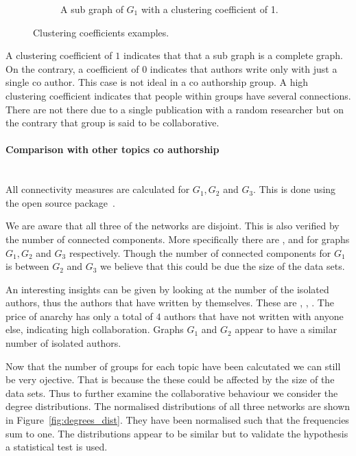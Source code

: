 \documentclass{article}
\theoremstyle{definition}
\newcommand{\prisonerscon}{}
\newcommand{\pricecon}{}
\newcommand{\auctioncon}{}
\newcommand{\prisonerisolated}{}
\newcommand{\auctionisolated}{}
\newcommand{\priceisolated}{}
\begin{document}
\begin{center}
\begin{figure}[!hbtp]
\begin{subfigure}{0.33\textwidth}
            \caption{A sub graph of \(G_1\) with a clustering coefficient of 1.}
        \end{subfigure}
    \caption{Clustering coefficients examples.}
    \label{fig:clustering_coefficients}
    \end{figure}
    \end{center}

A clustering coefficient of \(1\) indicates that that a sub graph is a
complete graph. On the contrary, a coefficient of \(0\) indicates that authors write only
with just a single co author. This case is not ideal in a co authorship group.
A high clustering coefficient indicates that people within groups have several
connections. There are not there due to a single publication with a random researcher
but on the contrary that group is said to be collaborative.

\paragraph{Comparison with other topics co authorship}
\mbox{ }\\

All connectivity measures are calculated for \(G_1, G_2\) and \(G_3\). This is
done using the open source package~\cite{networkx}.

We are aware that all three of the networks are disjoint. This is also verified
by the number of connected components. More specifically there are \prisonerscon,
\auctioncon and \pricecon for graphs \(G_1, G_2\) and \(G_3\) respectively.
Though the number of connected components for \(G_1\) is between \(G_2\) and \(G_3\)
we believe that this could be due the size of the data sets.

An interesting insights can be given by looking at the number of the isolated
authors, thus the authors that have written by themselves. These are
\prisonerisolated, \auctionisolated, \priceisolated. The price of anarchy has
only a total of \(4\) authors that have not written with anyone else, indicating
high collaboration. Graphs \(G_1\) and \(G_2\) appear to have a similar number
of isolated authors.

Now that the number of groups for each topic have been calcutated we can still
be very ojective. That is because the these could be affected by the size of the
data sets. Thus to further examine the collaborative behaviour we 
consider the degree distributions. The normalised distributions of all
three networks are shown in Figure~\ref{fig:degrees_dist}. They have been normalised
such that the frequencies sum to one. The distributions appear to be similar
but to validate the hypothesis a statistical test is used.
\end{document}
